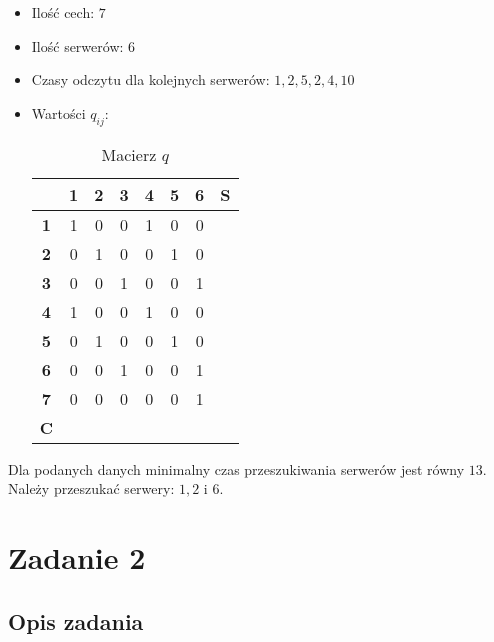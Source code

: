 \documentclass{article}
\begin{document}
    \begin{itemize}
        \item Ilość cech: $7$
        \item Ilość serwerów: $6$
        \item Czasy odczytu dla kolejnych serwerów: $1, 2, 5, 2, 4, 10$
        \item Wartości $q_{ij}$:
        \begin{table}[H]
            \begin{center}
                \begin{tabular}{c||c|c|c|c|c|c||c}
                     & \textbf{1} & \textbf{2} & \textbf{3} & \textbf{4} & \textbf{5} & \textbf{6} & \textbf{S} \\ 
                    \hline
                    \hline
                    \textbf{1} & 1 & 0 & 0 & 1 & 0 & 0 &  \\
                    \hline
                    \textbf{2} & 0 & 1 & 0 & 0 & 1 & 0 &  \\
                    \hline
                    \textbf{3} & 0 & 0 & 1 & 0 & 0 & 1 &  \\
                    \hline
                    \textbf{4} & 1 & 0 & 0 & 1 & 0 & 0 &  \\
                    \hline
                    \textbf{5} & 0 & 1 & 0 & 0 & 1 & 0 &  \\
                    \hline
                    \textbf{6} & 0 & 0 & 1 & 0 & 0 & 1 &  \\
                    \hline
                    \textbf{7} & 0 & 0 & 0 & 0 & 0 & 1 &  \\
                    \hline
                    \hline
                    \textbf{C} &  &  &  &  &  &  &  \\
                \end{tabular}
                \caption{Macierz $q$}
                \label{tab1}
            \end{center}
        \end{table}
    \end{itemize}

    Dla podanych danych minimalny czas przeszukiwania serwerów jest równy $13$. Należy przeszukać serwery: $1, 2$ i $6$.

    \section{Zadanie 2}
	\subsection{Opis zadania}
\end{document}
